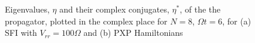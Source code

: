 \begin{figure}
  \centering
  \caption{Eigenvalues, $\eta$ and their complex conjugates, $\eta^*$,
    of the the propagator, plotted in the complex place for $N=8$,
    $\Omega t=6$, for (a) SFI with $V_{rr}=100\Omega$ and (b) PXP
    Hamiltonians}
\end{figure}


